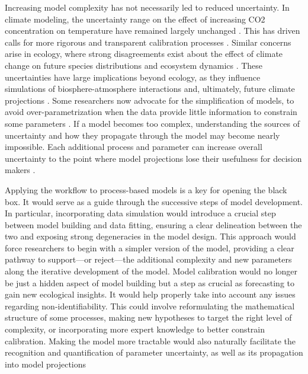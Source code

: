 \documentclass[11pt]{article}
\begin{document}
Increasing model complexity has not necessarily led to reduced uncertainty. In climate modeling, the uncertainty range on the effect of increasing CO2 concentration on temperature have remained largely unchanged \citep{Zelinka2020}. This has driven calls for more rigorous and transparent calibration processes \citep{balaji2022general}. Similar concerns arise in ecology, where strong disagreements exist about the effect of climate change on future species distributions \citep{Cheaib2012} and ecosystem dynamics \citep{Lovenduski2017}.
These uncertainties have large implications beyond ecology, as they influence simulations of biosphere-atmosphere interactions and, ultimately, future climate projections \citep{Bonan2018, simpson2025confronting}.
Some researchers now advocate for the simplification of models, to avoid over-parametrization when the data provide little information to constrain some parameters \citep{Wang2017, Harrison2021}. If a model becomes too complex, understanding the sources of uncertainty and how they propagate through the model may become nearly impossible.
Each additional process and parameter can increase overall uncertainty to the point where model projections lose their usefulness for decision makers \citep{Saltelli2020}.

Applying the workflow to process-based models is a key for opening the black box. It would serve as a guide through the successive steps of model development. In particular, incorporating data simulation would introduce a crucial step between model building and data fitting, ensuring a clear delineation between the two and exposing strong degeneracies in the model design. This approach would force researchers to begin with a simpler version of the model, providing a clear pathway to support---or reject---the additional complexity and new parameters along the iterative development of the model. 
Model calibration would no longer be just a hidden aspect of model building but a step as crucial as forecasting to gain new ecological insights. It would help properly take into account any issues regarding non-identifiability. This could involve reformulating the mathematical structure of some processes, making new hypotheses to target the right level of complexity, or incorporating more expert knowledge to better constrain calibration. Making the model more tractable would also naturally facilitate the recognition and quantification of parameter uncertainty, as well as its propagation into model projections
\end{document}
